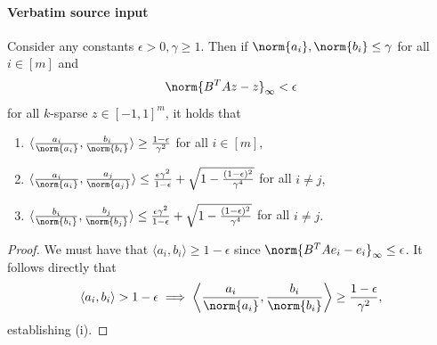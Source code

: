 \documentclass[10pt]{article}
\begin{document}
\paragraph{Verbatim source input}
\begin{ReviewVerbatim}
\begin{proposition}\label{prop:geometry-2}
    Consider any constants $\epsilon > 0, \gamma \ge 1$. Then if $\norm{a_i},\norm{b_i} \le \gamma$ for all $i\in [m]$ and
    \begin{equation}
        \norm{B^TAz - z}_\infty < \epsilon
    \end{equation}
    for all $k$-sparse $z\in [-1,1]^m$, it holds that
    \begin{enumerate}
        \item[(i)] $\langle \frac{a_i}{\norm{a_i}}, \frac{b_i}{\norm{b_i}}\rangle \ge \frac{1-\epsilon}{\gamma^2}$ for all $i\in [m],$
        \item[(ii)] $\langle \frac{a_i}{\norm{a_i}}, \frac{a_j}{\norm{a_j}}\rangle \le \frac{\epsilon\gamma^2}{1 - \epsilon} + \sqrt{1 - \frac{(1 - \epsilon)^2}{\gamma^4}}$ for all $i\neq j,$
        \item[(iii)] $\langle \frac{b_i}{\norm{b_i}}, \frac{b_j}{\norm{b_j}}\rangle \le \frac{\epsilon\gamma^2}{1 - \epsilon} + \sqrt{1 - \frac{(1 - \epsilon)^2}{\gamma^4}}$ for all $i\neq j.$
    \end{enumerate}
\end{proposition}

\begin{proof}
    We must have that $\langle a_i, b_i\rangle \ge 1 - \epsilon$ since $\norm{B^TAe_i - e_i}_\infty \le \epsilon$. It follows directly that
    \begin{equation}
       \langle a_i, b_i \rangle > 1 - \epsilon \implies \left\langle\frac{a_i}{\norm{a_i}}, \frac{b_i}{\norm{b_i}}\right\rangle \ge \frac{1-\epsilon}{\gamma^2},
    \end{equation}
    establishing (i).


\end{proof}
\end{ReviewVerbatim}
\end{document}
